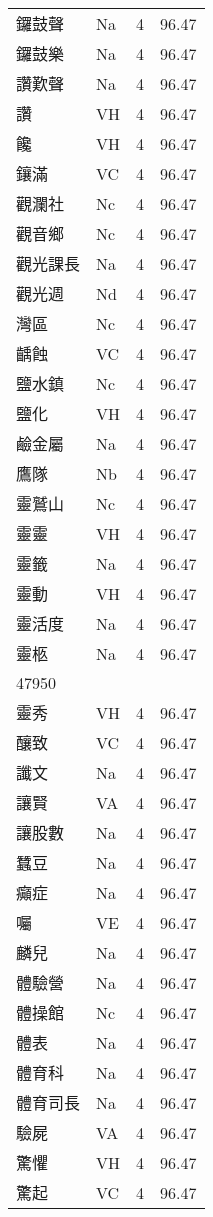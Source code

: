 \documentclass[twocolumn]{book}
\begin{document}
\begin{supertabular}{llrr}
鑼鼓聲 & Na & 4 &  96.47\\
鑼鼓樂 & Na & 4 &  96.47\\
讚歎聲 & Na & 4 &  96.47\\
讚 & VH & 4 &  96.47\\
饞 & VH & 4 &  96.47\\
鑲滿 & VC & 4 &  96.47\\
觀瀾社 & Nc & 4 &  96.47\\
觀音鄉 & Nc & 4 &  96.47\\
觀光課長 & Na & 4 &  96.47\\
觀光週 & Nd & 4 &  96.47\\
灣區 & Nc & 4 &  96.47\\
齲蝕 & VC & 4 &  96.47\\
鹽水鎮 & Nc & 4 &  96.47\\
鹽化 & VH & 4 &  96.47\\
鹼金屬 & Na & 4 &  96.47\\
鷹隊 & Nb & 4 &  96.47\\
靈鷲山 & Nc & 4 &  96.47\\
靈靈 & VH & 4 &  96.47\\
靈籤 & Na & 4 &  96.47\\
靈動 & VH & 4 &  96.47\\
靈活度 & Na & 4 &  96.47\\
靈柩 & Na & 4 &  96.47\\
47950\\
靈秀 & VH & 4 &  96.47\\
釀致 & VC & 4 &  96.47\\
讖文 & Na & 4 &  96.47\\
讓賢 & VA & 4 &  96.47\\
讓股數 & Na & 4 &  96.47\\
蠶豆 & Na & 4 &  96.47\\
癲症 & Na & 4 &  96.47\\
囑 & VE & 4 &  96.47\\
麟兒 & Na & 4 &  96.47\\
體驗營 & Na & 4 &  96.47\\
體操館 & Nc & 4 &  96.47\\
體表 & Na & 4 &  96.47\\
體育科 & Na & 4 &  96.47\\
體育司長 & Na & 4 &  96.47\\
驗屍 & VA & 4 &  96.47\\
驚懼 & VH & 4 &  96.47\\
驚起 & VC & 4 &  96.47\\

\end{supertabular}
\end{document}
